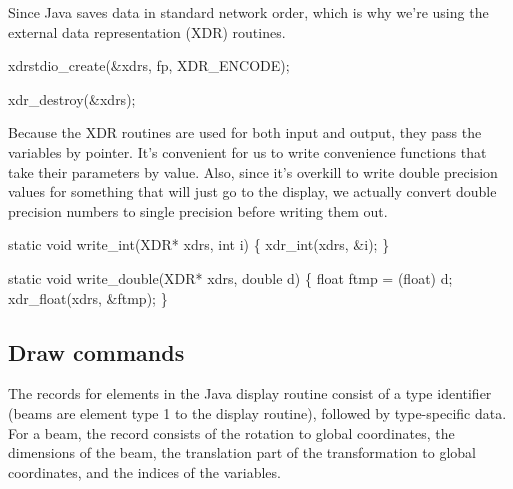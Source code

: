 Since Java saves data in standard network order, which is why we're
using the external data representation (XDR) routines.

\nwenddocs{}\endmoddef\nwstartdeflinemarkup{}\nwenddeflinemarkup
xdrstdio_create(&xdrs, fp, XDR_ENCODE);
\nwendcode{}\nwdocspar

\nwenddocs{}\endmoddef\nwstartdeflinemarkup{}\nwenddeflinemarkup
xdr_destroy(&xdrs);
\nwendcode{}\nwdocspar

Because the XDR routines are used for both input and output,
they pass the variables by pointer.  It's convenient for us
to write convenience functions that take their parameters
by value.  Also, since it's overkill to write double precision
values for something that will just go to the display, we
actually convert double precision numbers to single precision
before writing them out.

\nwenddocs{}\endmoddef\nwstartdeflinemarkup{}\nwenddeflinemarkup
static void write_int(XDR* xdrs, int i)
\{
    xdr_int(xdrs, &i);
\}

static void write_double(XDR* xdrs, double d)
\{
    float ftmp = (float) d;
    xdr_float(xdrs, &ftmp);
\}

\nwendcode{}\nwdocspar


\subsection{Draw commands}

The records for elements in the Java display routine consist
of a type identifier (beams are element type 1 to the display
routine), followed by type-specific data.  For a beam, the
record consists of the rotation to global coordinates,
the dimensions of the beam, the translation part of the transformation
to global coordinates, and the indices of the variables.

